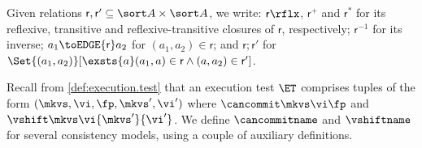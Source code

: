 Given relations $\mathsf r, \mathsf r' \subseteq \sort A \times \sort A$,
we write:  $\mathsf r\rflx$, $\mathsf r^+$ and $\mathsf r^*$ for its reflexive, transitive and reflexive-transitive closures of $\mathsf r$, respectively;
$\mathsf r^{-1}$ for its inverse;
$a_1 \toEDGE{\mathsf r} a_2$ for $(a_1, a_2) \in \mathsf r$;
and \( \mathsf r; \mathsf r'\) for \( \Set{(a_1,a_2)}[\exsts{a} (a_1,a) \in \mathsf r\land (a,a_2) \in \mathsf r']\).

%
%
%

Recall from \cref{def:execution.test} that an execution test $\ET$
comprises  tuples of the form $(\mkvs,\vi, \fp, \mkvs', \vi')$ 
where  $\cancommit \mkvs \vi \fp$ and $\vshift \mkvs \vi {\mkvs'} {\vi'}$. 
%
We define $\cancommitname$ and $\vshiftname$ for several consistency
models, using a couple of auxiliary definitions. 


